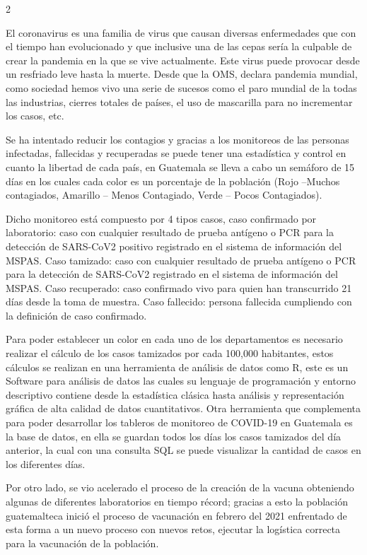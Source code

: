 \documentclass[12pt,spanish,Letterpaper,openany]{book}
\begin{document}
\begin {multicols}{2}

El coronavirus es una familia de virus que causan diversas enfermedades que con el tiempo han evolucionado y que inclusive una de las cepas sería la culpable de crear la pandemia en la que se vive actualmente. Este virus puede provocar desde un resfriado leve hasta la muerte. Desde que la OMS, declara pandemia mundial, como sociedad hemos vivo una serie de sucesos como el paro mundial de la todas las industrias, cierres totales de países, el uso de mascarilla para no incrementar los casos, etc.

Se ha intentado reducir los contagios y gracias a los monitoreos de las personas infectadas, fallecidas y recuperadas se puede tener una estadística y control en cuanto la libertad de cada país, en Guatemala se lleva a cabo un semáforo de 15 días en los cuales cada color es un porcentaje de la población (Rojo --Muchos contagiados, Amarillo -- Menos Contagiado, Verde -- Pocos Contagiados).

Dicho monitoreo está compuesto por 4 tipos casos, caso confirmado por laboratorio: caso con cualquier resultado de prueba antígeno o PCR para la detección de SARS-CoV2 positivo registrado en el sistema de información del MSPAS. Caso tamizado: caso con cualquier resultado de prueba antígeno o PCR para la detección de SARS-CoV2 registrado en el sistema de información del MSPAS. Caso recuperado: caso confirmado vivo para quien han transcurrido 21 días desde la toma de muestra. Caso fallecido: persona fallecida cumpliendo con la definición de caso confirmado.

Para poder establecer un color en cada uno de los departamentos es necesario realizar el cálculo de los casos tamizados por cada 100,000 habitantes, estos cálculos se realizan en una herramienta de análisis de datos como R, este es un Software para análisis de datos las cuales su lenguaje de programación y entorno descriptivo contiene desde la estadística clásica hasta análisis y representación gráfica de alta calidad de datos cuantitativos. Otra herramienta que complementa para poder desarrollar los tableros de monitoreo de COVID-19 en Guatemala es la base de datos, en ella se guardan todos los días los casos tamizados del día anterior, la cual con una consulta SQL se puede visualizar la cantidad de casos en los diferentes días.

Por otro lado, se vio acelerado el proceso de la creación de la vacuna obteniendo algunas de diferentes laboratorios en tiempo récord; gracias a esto la población guatemalteca inició el proceso de vacunación en febrero del 2021 enfrentado de esta forma a un nuevo proceso con nuevos retos, ejecutar la logística correcta para la vacunación de la población.


\end{multicols}
\end{document}
